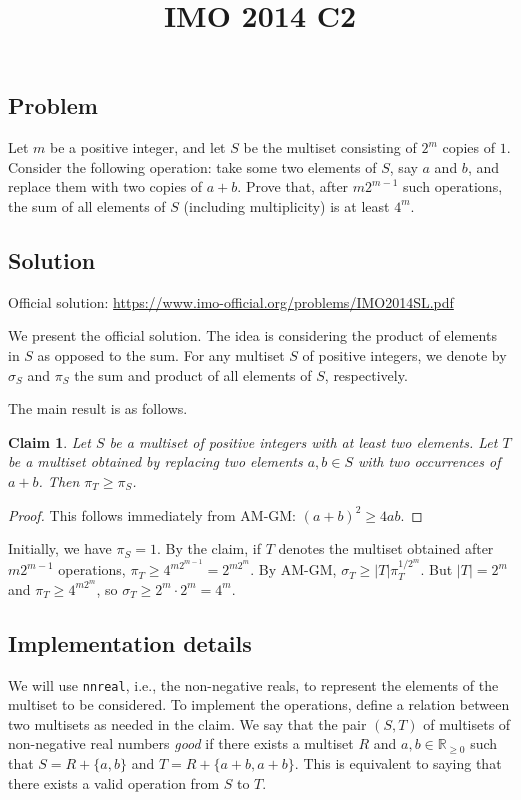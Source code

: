 \documentclass{article}
\title{IMO 2014 C2}
\author{}
\date{}
\newcommand{\R}{\mathbb{R}}
\newtheorem*{claim}{Claim}
\begin{document}
\maketitle



\subsection*{Problem}

Let $m$ be a positive integer, and let $S$ be the multiset consisting of $2^m$ copies of $1$.
Consider the following operation: take some two elements of $S$, say $a$ and $b$, and replace them with two copies of $a + b$.
Prove that, after $m 2^{m - 1}$ such operations, the sum of all elements of $S$ (including multiplicity) is at least $4^m$.



\subsection*{Solution}

Official solution: \url{https://www.imo-official.org/problems/IMO2014SL.pdf}

We present the official solution.
The idea is considering the product of elements in $S$ as opposed to the sum.
For any multiset $S$ of positive integers, we denote by $\sigma_S$ and $\pi_S$ the sum and product of all elements of $S$, respectively.

The main result is as follows.

\begin{claim}
Let $S$ be a multiset of positive integers with at least two elements.
Let $T$ be a multiset obtained by replacing two elements $a, b \in S$ with two occurrences of $a + b$.
Then $\pi_T \geq \pi_S$.
\end{claim}
\begin{proof}
This follows immediately from AM-GM: $(a + b)^2 \geq 4ab$.
\end{proof}

Initially, we have $\pi_S = 1$.
By the claim, if $T$ denotes the multiset obtained after $m 2^{m - 1}$ operations, $\pi_T \geq 4^{m 2^{m - 1}} = 2^{m 2^m}$.
By AM-GM, $\sigma_T \geq |T| \pi_T^{1/2^m}$.
But $|T| = 2^m$ and $\pi_T \geq 4^{m 2^m}$, so $\sigma_T \geq 2^m \cdot 2^m = 4^m$.



\subsection*{Implementation details}

We will use \texttt{nnreal}, i.e., the non-negative reals, to represent the elements of the multiset to be considered.
To implement the operations, define a relation between two multisets as needed in the claim.
We say that the pair $(S, T)$ of multisets of non-negative real numbers \emph{good} if there exists a multiset $R$ and $a, b \in \R_{\geq 0}$ such that $S = R + \{a, b\}$ and $T = R + \{a + b, a + b\}$.
This is equivalent to saying that there exists a valid operation from $S$ to $T$.
\end{document}
